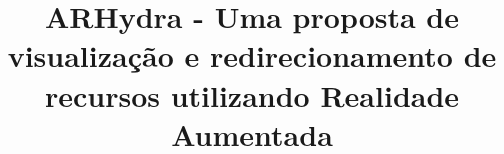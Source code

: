 \documentclass[bacharelado]{unb-cic}
\title{ARHydra - Uma proposta de visualização e redirecionamento de recursos utilizando Realidade
Aumentada}
\begin{document}
 	\lstset{tabsize=4}
  	\renewcommand\lstlistingname{Listagem}
  	\renewcommand\lstlistlistingname{Listagens}
  	\maketitle
  	\pretextual
 
	
	
	
	
	\tableofcontents
	\listoffigures
	\listoftables
	
	\textual
	
	
	
	
	

	
	\postextual
	
	
	
\end{document}
